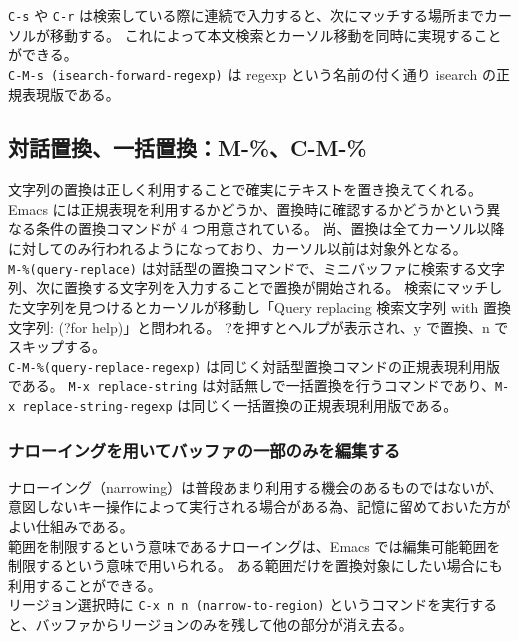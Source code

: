 \texttt{C-s} や \texttt{C-r} は検索している際に連続で入力すると、次にマッチする場所までカーソルが移動する。
これによって本文検索とカーソル移動を同時に実現することができる。\\

\texttt{C-M-s (isearch-forward-regexp)} は regexp という名前の付く通り isearch の正規表現版である。
\subsection{対話置換、一括置換：M-\%、C-M-\%}
文字列の置換は正しく利用することで確実にテキストを置き換えてくれる。
Emacs には正規表現を利用するかどうか、置換時に確認するかどうかという異なる条件の置換コマンドが 4 つ用意されている。
尚、置換は全てカーソル以降に対してのみ行われるようになっており、カーソル以前は対象外となる。\\

\texttt{M-\%(query-replace)} は対話型の置換コマンドで、ミニバッファに検索する文字列、次に置換する文字列を入力することで置換が開始される。
検索にマッチした文字列を見つけるとカーソルが移動し「Query replacing 検索文字列 with 置換文字列: (?\hphantom{.}for help)」と問われる。
?\hphantom{.}を押すとヘルプが表示され、y で置換、n でスキップする。\\

\texttt{C-M-\%(query-replace-regexp)} は同じく対話型置換コマンドの正規表現利用版である。
\texttt{M-x replace-string} は対話無しで一括置換を行うコマンドであり、\texttt{M-x replace-string-regexp} は同じく一括置換の正規表現利用版である。
\subsubsection{ナローイングを用いてバッファの一部のみを編集する}
ナローイング（narrowing）は普段あまり利用する機会のあるものではないが、意図しないキー操作によって実行される場合がある為、記憶に留めておいた方がよい仕組みである。\\

範囲を制限するという意味であるナローイングは、Emacs では編集可能範囲を制限するという意味で用いられる。
ある範囲だけを置換対象にしたい場合にも利用することができる。\\

リージョン選択時に \texttt{C-x n n (narrow-to-region)} というコマンドを実行すると、バッファからリージョンのみを残して他の部分が消え去る。\\

